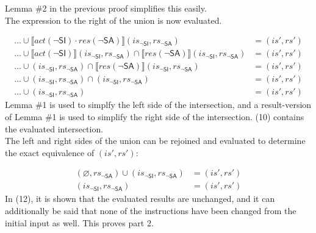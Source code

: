 \documentclass[12pt, letterpaper]{article}
\let\emptyset\varnothing
\newcommand\interp[1]{\llbracket #1 \rrbracket}
\begin{document}
     Lemma \#2 in the previous proof simplifies this easily.\\
     The expression to the right of the union is now evaluated.
 \par\nobreak
 {\fontsize{10pt}{12pt}\selectfont
 \begin{align}
     \ldots \cup %
     \interp{ \mathit{act}(\neg\mathsf{SI}) \cdot
      \mathit{res}(\neg\mathsf{SA}) } (\mathit{is_{\mathsf{\neg SI}}}, \mathit{rs_{\mathsf{\neg SA}}})
     &=
     (\mathit{is}', \mathit{rs}')
     \\
     \ldots \cup %
     \interp{ \mathit{act}(\neg\mathsf{SI}) } (\mathit{is_{\mathsf{\neg SI}}}, \mathit{rs_{\mathsf{\neg SA}}}) \cap
     \interp{ \mathit{res}(\neg\mathsf{SA}) } (\mathit{is_{\mathsf{\neg SI}}}, \mathit{rs_{\mathsf{\neg SA}}})
     &=
     (\mathit{is}', \mathit{rs}')
     \\
     \ldots \cup %
     (\mathit{is_{\mathsf{\neg SI}}}, \mathit{rs_{\mathsf{\neg SA}}}) \cap
     \interp{ \mathit{res}(\neg\mathsf{SA}) } (\mathit{is_{\mathsf{\neg SI}}}, \mathit{rs_{\mathsf{\neg SA}}})
     &=
     (\mathit{is}', \mathit{rs}')
     \\
     \ldots \cup %
     (\mathit{is_{\mathsf{\neg SI}}}, \mathit{rs_{\mathsf{\neg SA}}}) \cap
     (\mathit{is_{\mathsf{\neg SI}}}, \mathit{rs_{\mathsf{\neg SA}}})
     &=
     (\mathit{is}', \mathit{rs}')
     \\
     \ldots \cup %
     (\mathit{is_{\mathsf{\neg SI}}}, \mathit{rs_{\mathsf{\neg SA}}})
     &=
     (\mathit{is}', \mathit{rs}')
 \end{align}
 }%
     Lemma \#1 is used to simplfy the left side of the intersection, and a result-version of Lemma \#1 is used to simplify the right side of the intersection. (10) contains the evaluated intersection.\\
     The left and right sides of the union can be rejoined and evaluated to determine the exact equivalence of $(\mathit{is}', \mathit{rs}')$:
 \par\nobreak
 {\fontsize{10pt}{12pt}\selectfont
 \begin{align}
     (\emptyset, \mathit{rs_{\mathsf{\neg SA}}}) \cup
     (\mathit{is_{\mathsf{\neg SI}}}, \mathit{rs_{\mathsf{\neg SA}}})
     &=
     (\mathit{is}', \mathit{rs}')
     \\
     (\mathit{is_{\mathsf{\neg SI}}}, \mathit{rs_{\mathsf{\neg SA}}})
     &=
     (\mathit{is}', \mathit{rs}')
 \end{align}
 }%
     In (12), it is shown that the evaluated results are unchanged, and it can additionally be said that none of the instructions have been changed from the initial input as well.  This proves part 2.
\end{document}
